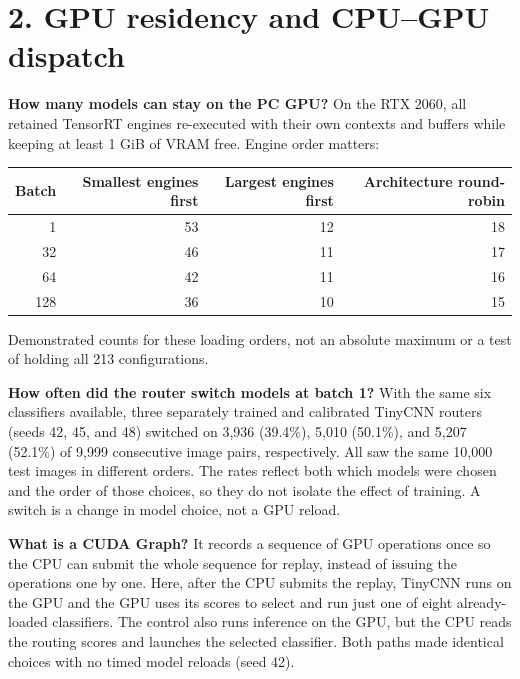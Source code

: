 \documentclass[10pt,a4paper]{article}
\newcommand{\heading}[1]{\section*{\color{navy}#1}}
\newcommand{\smallcap}[1]{{\footnotesize\color{navy}#1}\par}
\begin{document}
\newpage
\heading{2. GPU residency and CPU--GPU dispatch}
\textbf{How many models can stay on the PC GPU?} On the RTX 2060, all retained TensorRT engines re-executed with their own contexts and buffers while keeping at least 1 GiB of VRAM free. Engine order matters:
\begin{center}\small
\begin{tabular}{@{}rrrr@{}}\toprule
Batch & Smallest engines first & Largest engines first & Architecture round-robin\\
\midrule
1 & 53 & 12 & 18\\
32 & 46 & 11 & 17\\
64 & 42 & 11 & 16\\
128 & 36 & 10 & 15\\
\bottomrule\end{tabular}
\end{center}
\smallcap{Demonstrated counts for these loading orders, not an absolute maximum or a test of holding all 213 configurations.}

\textbf{How often did the router switch models at batch 1?} With the same six classifiers available, three separately trained and calibrated TinyCNN routers (seeds 42, 45, and 48) switched on 3,936 (39.4\%), 5,010 (50.1\%), and 5,207 (52.1\%) of 9,999 consecutive image pairs, respectively. All saw the same 10,000 test images in different orders. The rates reflect both which models were chosen and the order of those choices, so they do not isolate the effect of training. A switch is a change in model choice, not a GPU reload.

\textbf{What is a CUDA Graph?} It records a sequence of GPU operations once so the CPU can submit the whole sequence for replay, instead of issuing the operations one by one. Here, after the CPU submits the replay, TinyCNN runs on the GPU and the GPU uses its scores to select and run just one of eight already-loaded classifiers. The control also runs inference on the GPU, but the CPU reads the routing scores and launches the selected classifier. Both paths made identical choices with no timed model reloads (seed 42).
\end{document}
